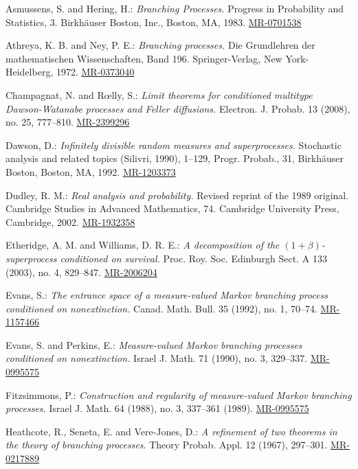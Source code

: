 \documentclass[12pt,a4paper]{amsart}
\numberwithin{equation}{section}
\theoremstyle{plain}
\theoremstyle{definition}
\theoremstyle{remark}
\def\MR#1{\href{http://www.ams.org/mathscinet-getitem?mr=#1}{MR-#1}}
\begin{document}
\begin{thebibliography}{99}

	Asmussens, S. and Hering, H.:
	\emph{Branching Processes.}
	Progress in Probability and Statistics, 3. Birkh\"auser Boston, Inc., Boston, MA, 1983.
	\MR{0701538}

	Athreya, K. B. and Ney, P. E.:
	\emph{Branching processes.}
	Die Grundlehren der mathematischen Wissenschaften, Band 196. Springer-Verlag, New York-Heidelberg, 1972.
	\MR{0373040}
	
	Champagnat, N. and R{\oe}lly, S.:
	\emph{Limit theorems for conditioned multitype Dawson-Watanabe processes and Feller diffusions.}
	Electron. J. Probab. 13 (2008), no. 25, 777--810.
	\MR{2399296}

	Dawson, D.:
	\emph{Infinitely divisible random measures and superprocesses.}
	Stochastic analysis and related topics (Silivri, 1990), 1--129, Progr. Probab., 31, Birkh\"auser Boston, Boston, MA, 1992.
	\MR{1203373}
	
	Dudley, R. M.:
	\emph{Real analysis and probability.}
	Revised reprint of the 1989 original. Cambridge Studies in Advanced Mathematics, 74. Cambridge University Press, Cambridge, 2002.
	\MR{1932358} %
	
	Etheridge, A. M. and Williams, D. R. E.:
	\emph{A decomposition of the $(1+\beta)$-superprocess conditioned on survival.}
	Proc. Roy. Soc. Edinburgh Sect. A 133 (2003), no. 4, 829--847.
	\MR{2006204} %
	
	Evans, S.:
	\emph{The entrance space of a measure-valued Markov branching process conditioned on nonextinction.}
	Canad. Math. Bull. 35 (1992), no. 1, 70--74.
	\MR{1157466} %
	
	Evans, S. and Perkins, E.:
	\emph{Measure-valued Markov branching processes conditioned on nonextinction.}
	Israel J. Math. 71 (1990), no. 3,
	329--337.
	\MR{0995575}
	
	Fitzsimmons, P.:
	\emph{Construction and regularity of measure-valued Markov branching processes.}
	Israel J. Math. 64 (1988), no. 3, 337–361 (1989).
	\MR{0995575} %

	Heathcote, R.,  Seneta, E.  and Vere-Jones, D.:
	\emph{A refinement of two theorems in the theory of branching processes}.
	Theory Probab. Appl. 12 (1967), 297--301.
	\MR{0217889}


\end{thebibliography}
\end{document}
